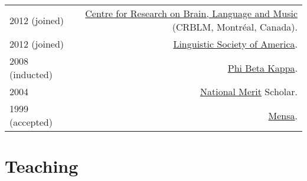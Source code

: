 \documentclass[letterpaper]{article}
\makeatletter
\newcommand{\myvrule}{\color{lightgray}\vrule width 1.0pt}
\newenvironment{cvsection}{%
  \renewcommand{\arraystretch}{1.75}
  \begin{longtable}[l]{@{} L R @{}}
}{%
  \end{longtable}
}
\makeatother
\begin{document}
\begin{cvsection}
  2012 {\footnotesize (joined)} & \href{http://www.crblm.ca/}{Centre for
  Research on Brain, Language and Music} (CRBLM, Montr\'{e}al, Canada). \\

  2012 {\footnotesize (joined)} &
  \href{http://www.linguisticsociety.org/}{Linguistic Society of America}. \\

  2008 {\footnotesize (inducted)} & \href{http://www.pbk.org/}{Phi Beta Kappa}. \\

  2004 & \href{http://www.nationalmerit.org/}{National Merit} Scholar. \\

  1999 {\footnotesize (accepted)} & \href{http://www.mensa.org/}{Mensa}. \\
\end{cvsection}



\section*{Teaching}
\end{document}
